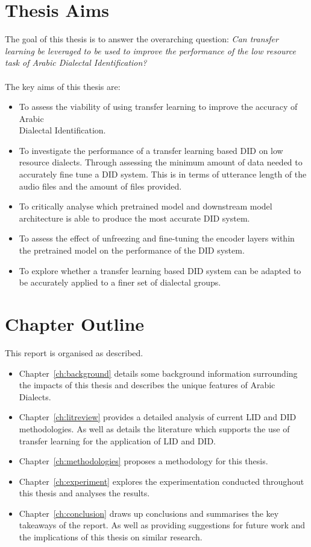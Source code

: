 \section{Thesis Aims}
The goal of this thesis is to answer the overarching question:\emph{
Can transfer learning be leveraged to be used to improve the performance of the low resource task of Arabic Dialectal Identification?}\\
\\The key aims of this thesis are: 

\begin{itemize}
    \item To assess the viability of using transfer learning to improve the accuracy of Arabic \\Dialectal Identification. 
    \item To investigate the performance of a transfer learning based DID on low resource dialects. Through assessing the minimum amount of data needed to accurately fine tune a DID system. This is in terms of utterance length of the audio files and the amount of files provided. 
    \item To critically analyse which pretrained model and downstream model architecture is able to produce the most accurate DID system. 
    \item To assess the effect of unfreezing and fine-tuning the encoder layers within the pretrained model on the performance of the DID system. 
    \item To explore whether a transfer learning based DID system can be adapted to be accurately applied to a finer set of dialectal groups. 
\end{itemize}

\section{Chapter Outline}
This report is organised as described. 
\begin{itemize}
\item Chapter~\ref{ch:background} details some background information surrounding the impacts of this thesis and describes the unique features of Arabic Dialects. 
\item Chapter~\ref{ch:litreview} provides a detailed analysis of current LID and DID methodologies. As well as 
details the literature which supports the use of transfer learning for the application of LID and DID. 
\item Chapter~\ref{ch:methodologies} proposes a methodology for this thesis. 
\item Chapter~\ref{ch:experiment} explores the experimentation conducted throughout this thesis and analyses the results. 
\item Chapter~\ref{ch:conclusion} draws up conclusions and summarises the key takeaways of the report. As well as providing suggestions for future work and the implications of this thesis on similar research. 
\end{itemize}
